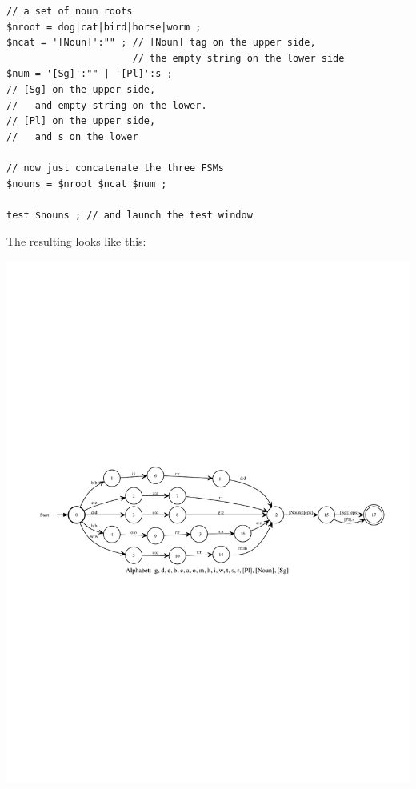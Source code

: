 \begin{Verbatim}
// a set of noun roots
$nroot = dog|cat|bird|horse|worm ;
$ncat = '[Noun]':"" ; // [Noun] tag on the upper side,
                      // the empty string on the lower side
$num = '[Sg]':"" | '[Pl]':s	; 
// [Sg] on the upper side, 
//   and empty string on the lower.
// [Pl] on the upper side, 
//   and s on the lower

// now just concatenate the three FSMs
$nouns = $nroot $ncat $num ;

test $nouns ; // and launch the test window
\end{Verbatim}

\noindent
The resulting \fst{} looks like this:

\begin{center}
\includegraphics[width=135mm]{images/simplenounsgpl.pdf}
\end{center}


